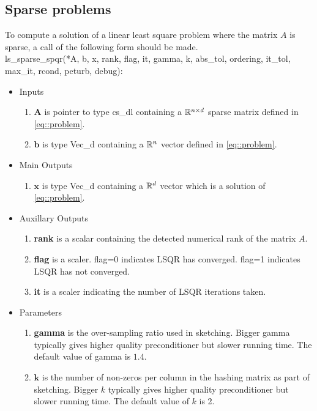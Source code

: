 \documentclass[english,11pt]{article}
\begin{document}
\subsection{Sparse problems}

To compute a solution of a linear least square problem where the matrix $A$ is sparse, a call of the following form should be made. \\

ls_sparse_spqr(*A, b, x, 
    rank, flag, it, gamma, k, abs_tol, ordering, it_tol, max_it, rcond, peturb, debug):

	\begin{itemize}
	\setlength\itemsep{-0.5em}
	\item Inputs 
		\begin{enumerate}
			\item $\mathbf A$ is pointer to type cs_dl containing a $\mathbb{R}^{n \times d}$ sparse matrix defined in \eqref{eq::problem}.
			\item $\mathbf b$ is type Vec_d containing a $\mathbb{R}^n$ vector defined in \eqref{eq::problem}.
		\end{enumerate}
	
	\item Main Outputs
		\begin{enumerate}
			\item {$\mathbf x$} is type Vec_d containing a $\mathbb{R}^d$ vector which is a solution of \eqref{eq::problem}.
		\end{enumerate}

	\item Auxillary Outputs
		\begin{enumerate}
			\item {\bf rank} is a scalar containing the detected numerical rank of the matrix $A$. 
			\item {\bf flag} is a scaler. flag=0 indicates LSQR has converged. flag=1 indicates LSQR has not converged. 
			\item {\bf it} is a scaler indicating the number of LSQR iterations taken. 
		\end{enumerate}
		

	\item Parameters
		\begin{enumerate}
			\item {\bf gamma} is the over-sampling ratio used in sketching. Bigger gamma typically gives higher quality preconditioner but slower running time. The default value of gamma is $1.4$.

			\item $\mathbf k$ is the number of non-zeros per column in the hashing matrix as part of sketching. Bigger $k$ typically gives higher quality preconditioner but slower running time. The default value of $k$ is 2. 


\end{enumerate}
\end{itemize}
\end{document}
